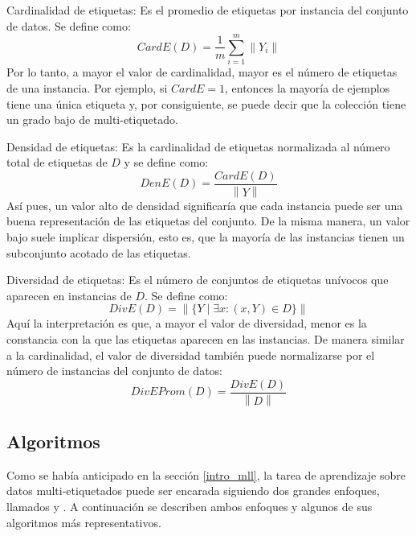 \begin{description}
   \item{Cardinalidad de etiquetas}: Es el promedio de etiquetas por instancia
      del conjunto de datos. Se define como: 
      \begin{equation}
      \label{eq:mll_card}
         CardE(D) = \frac{1}{m} \sum_{i=1}^{m} \left\|Y_{i}\right\|
      \end{equation}
      Por lo tanto, a mayor el valor de cardinalidad, mayor es el número de
      etiquetas de una instancia. Por ejemplo, si $CardE = 1$, entonces la
      mayoría de ejemplos tiene una única etiqueta y, por consiguiente, se puede
      decir que la colección tiene un grado bajo de multi-etiquetado.  
   \item{Densidad de etiquetas}: Es la cardinalidad de etiquetas normalizada al
      número total de etiquetas de $D$ y se define como:
      \begin{equation}
         DenE(D) = \frac{CardE(D)}{\left\|Y\right\|}
      \end{equation}
      Así pues, un valor alto de densidad significaría que cada instancia puede
      ser una buena representación de las etiquetas del conjunto. De la misma
      manera, un valor bajo suele implicar dispersión, esto es, que la mayoría
      de las instancias tienen un subconjunto acotado de las etiquetas. 
   \item{Diversidad de etiquetas}: Es el número de conjuntos de etiquetas
      unívocos que aparecen en instancias de $D$. Se define como:
      \begin{equation}
         DivE(D) = \left\|\{Y \mid \exists x: (x, Y) \in D\}\right\|
      \end{equation}
      Aquí la interpretación es que, a mayor el valor de diversidad, menor es la
      constancia con la que las etiquetas aparecen en las instancias. De manera
      similar a la cardinalidad, el valor de diversidad también puede
      normalizarse por el número de instancias del conjunto de datos: 
      \begin{equation}
         DivEProm(D) = \frac{DivE(D)}{\left\|D\right\|}
      \end{equation}
\end{description}

\subsection{Algoritmos}

Como se había anticipado en la sección \ref{intro_mll}, la tarea de aprendizaje
sobre datos multi-etiquetados puede ser encarada siguiendo dos grandes enfoques,
llamados  y . A continuación se describen ambos enfoques y algunos de sus
algoritmos más representativos.

